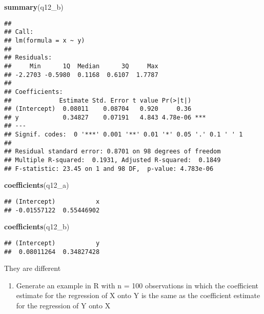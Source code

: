 \documentclass[
]{article}
\newenvironment{Shaded}{\begin{snugshade}}{\end{snugshade}}
\newcommand{\FunctionTok}[1]{\textcolor[rgb]{0.13,0.29,0.53}{\textbf{#1}}}
\newcommand{\NormalTok}[1]{#1}
\providecommand{\tightlist}{%
  \setlength{\itemsep}{0pt}\setlength{\parskip}{0pt}}
\begin{document}
\begin{Shaded}
\begin{Highlighting}[]
\FunctionTok{summary}\NormalTok{(q12\_b)}
\end{Highlighting}
\end{Shaded}

\begin{verbatim}
## 
## Call:
## lm(formula = x ~ y)
## 
## Residuals:
##     Min      1Q  Median      3Q     Max 
## -2.2703 -0.5980  0.1168  0.6107  1.7787 
## 
## Coefficients:
##             Estimate Std. Error t value Pr(>|t|)    
## (Intercept)  0.08011    0.08704   0.920     0.36    
## y            0.34827    0.07191   4.843 4.78e-06 ***
## ---
## Signif. codes:  0 '***' 0.001 '**' 0.01 '*' 0.05 '.' 0.1 ' ' 1
## 
## Residual standard error: 0.8701 on 98 degrees of freedom
## Multiple R-squared:  0.1931, Adjusted R-squared:  0.1849 
## F-statistic: 23.45 on 1 and 98 DF,  p-value: 4.783e-06
\end{verbatim}

\begin{Shaded}
\begin{Highlighting}[]
\FunctionTok{coefficients}\NormalTok{(q12\_a)}
\end{Highlighting}
\end{Shaded}

\begin{verbatim}
## (Intercept)           x 
## -0.01557122  0.55446902
\end{verbatim}

\begin{Shaded}
\begin{Highlighting}[]
\FunctionTok{coefficients}\NormalTok{(q12\_b)}
\end{Highlighting}
\end{Shaded}

\begin{verbatim}
## (Intercept)           y 
##  0.08011264  0.34827428
\end{verbatim}

They are different

\begin{enumerate}
\def\labelenumi{(\alph{enumi})}
\setcounter{enumi}{2}
\tightlist
\item
  Generate an example in R with n = 100 observations in which the
  coefficient estimate for the regression of X onto Y is the same as the
  coefficient estimate for the regression of Y onto X
\end{enumerate}
\end{document}
